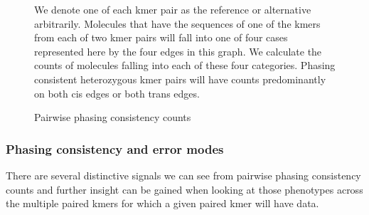 \begin{figure}[htbp!]
\caption{Pairwise phasing consistency counts}\label{figure:consistency}
\centering
{}
\par{
We denote one of each kmer pair as the reference or alternative arbitrarily. Molecules that have the sequences of one of the kmers from each of two kmer pairs will fall into one of four cases represented here by the four edges in this graph. We calculate the counts of molecules falling into each of these four categories. Phasing consistent heterozygous kmer pairs will have counts predominantly on both cis edges or both trans edges.
}
\end{figure}

\subsubsection{Phasing consistency and error modes}

\par{
There are several distinctive signals we can see from pairwise phasing consistency counts and further insight can be gained when looking at those phenotypes across the multiple paired kmers for which a given paired kmer will have data.
} \\


